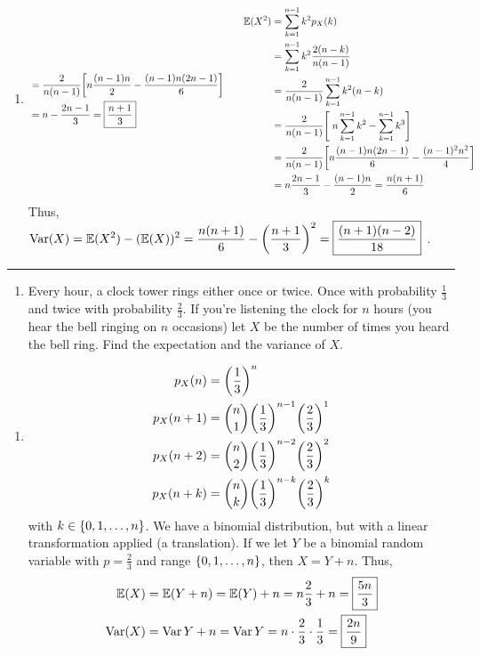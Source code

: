 \documentclass{article}
\DeclarePairedDelimiter{\paren}{(}{)}
\DeclarePairedDelimiter{\brac}{[}{]}
\DeclarePairedDelimiter{\set}{\{}{\}}
\DeclareMathOperator{\Var}{Var}
\newenvironment{problem}[1]    %
{
	\begin{enumerate}[leftmargin = 0in]
		\item[\bfseries{#1}]
}
{	\end{enumerate}
}
\newenvironment{solution}    %
{
	\begin{enumerate}[leftmargin = 0in]
		\item[\bfseries{Solution}]
}
{
	\end{enumerate}
}
\begin{document}
\begin{solution}
\begin{equation*}
\begin{aligned}[c]
				&= \frac{2}{n\paren{n - 1}} \brac[\bigg]{n\frac{\paren{n - 1}n}{2} - \frac{\paren{n - 1}n\paren{2n - 1}}{6}} \\
				&= n - \frac{2n - 1}{3} = \boxed{\frac{n + 1}{3}}
			\end{aligned}
			\qquad
			\begin{aligned}[c]
				\mathbb{E}\paren{X^2} &= \sum_{k = 1}^{n-1} k^2p_X\paren{k} \\
				&= \sum_{k = 1}^{n-1} k^2\frac{2\paren{n - k}}{n\paren{n - 1}} \\
				&= \frac{2}{n\paren{n - 1}} \sum_{k = 1}^{n-1} k^2\paren{n - k} \\
				&= \frac{2}{n\paren{n - 1}} \brac[\Bigg]{\; n\sum_{k = 1}^{n-1} k^2 - \sum_{k = 1}^{n-1} k^3} \\
				&= \frac{2}{n\paren{n - 1}} \brac[\bigg]{n\frac{\paren{n - 1}n\paren{2n - 1}}{6} - \frac{\paren{n - 1}^2n^2}{4}} \\
				&= n\frac{2n - 1}{3} - \frac{\paren{n - 1}n}{2} = \frac{n\paren{n + 1}}{6}
			\end{aligned}
		\end{equation*}
		Thus, $\displaystyle \Var\paren{X} = \mathbb{E}\paren{X^2} - \paren{\mathbb{E}\paren{X}}^2 = \frac{n\paren{n + 1}}{6} - \paren[\bigg]{\frac{n + 1}{3}}^2 = \boxed{\frac{\paren{n + 1}\paren{n - 2}}{18}}$ .
	\end{solution}
	
\hrule %

	\begin{problem}{4}
		Every hour, a clock tower rings either once or twice. Once with probability $\frac{1}{3}$ and twice with probability $\frac{2}{3}$. If you're listening the clock for $n$ hours (you hear the bell ringing on $n$ occasions) let $X$ be the number of times you heard the bell ring. Find the expectation and the variance of $X$.
	\end{problem}

	\begin{solution}
		\begin{align*}
			p_X\paren{n} &= \paren[\bigg]{\frac{1}{3}}^n \\
			p_X\paren{n + 1} &= \binom{n}{1}\paren[\bigg]{\frac{1}{3}}^{n-1}\paren[\bigg]{\frac{2}{3}}^1 \\
			p_X\paren{n + 2} &= \binom{n}{2}\paren[\bigg]{\frac{1}{3}}^{n-2}\paren[\bigg]{\frac{2}{3}}^2 \\
			p_X\paren{n + k} &= \binom{n}{k}\paren[\bigg]{\frac{1}{3}}^{n-k}\paren[\bigg]{\frac{2}{3}}^k
		\end{align*}
		with $k \in \set{0, 1, \ldots, n}$. We have a binomial distribution, but with a linear transformation applied (a translation). If we let $Y$ be a binomial random variable with $p = \frac{2}{3}$ and range $\set{0, 1, \ldots, n}$, then $X = Y + n$. Thus,
		\begin{align*}
			\mathbb{E}\paren{X} &= \mathbb{E}\paren{Y + n} = \mathbb{E}\paren{Y} + n = n\frac{2}{3} + n = \boxed{\frac{5n}{3}} \\
			\Var\paren{X} &= \Var{Y + n} = \Var{Y} = n \cdot \frac{2}{3} \cdot \frac{1}{3} = \boxed{\frac{2n}{9}}
		\end{align*}
	\end{solution}
	
\end{document}
